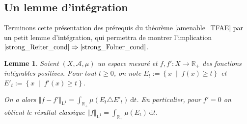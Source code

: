 \documentclass[a4paper,12pt]{article}
\newtheorem{lemma}[theorem]{Lemme}
\newcommand{\R}{\mathbb{R}}
\newcommand{\ev}{\mathrm{ev}}
\newcommand{\norm}[1]{\left\Vert #1\right\Vert}
\newcommand{\abs}[1]{\left\vert#1\right\vert}
\newcommand{\set}[1]{\left\{ #1 \right\}}
\newcommand{\integral}[4]{\int_{#1}^{#2} #3~\mathrm{d}#4}
\newcommand\fundef[3]{#1: \left\{\begin{array}{ccc}#2\\#3\end{array}\right.}
\newcommand{\tq}{\;\middle|\;}
\newcommand{\ssi}{si et seulement si }
\newcommand{\inv}{^{-1}}
\newcommand{\comp}{\circ}
\newcommand{\nhds}{\mathcal{N}}
\renewcommand{\implies}{\Rightarrow}
\renewcommand{\iff}{\Leftrightarrow}
\begin{document}

\subsection{Un lemme d'intégration}

Terminons cette présentation des prérequis du théorème \ref{amenable_TFAE} par un petit lemme d'intégration,
qui permettra de montrer l'implication $\eqref{strong_Reiter_cond}\implies\eqref{strong_Folner_cond}$. 

\begin{lemma}\label{folner_key}
    Soient $(X, \mathcal{A}, \mu)$ un espace mesuré et $f, f':X\to\R_+$ des fonctions intégrables positives.
    Pour tout $t\geq0$, on note $E_t := \set{x\tq f(x)\geq t}$ et $E'_t := \set{x\tq f'(x)\geq t}$.

    On a alors $\norm{f - f'}_{\mathrm{L}^1} = \integral{\R_+}{}{\mu(E_t\triangle E'_t)}{t}$. En particulier, pour $f' = 0$
    on obtient le résultat classique $\norm{f}_{\mathrm{L}^1} = \integral{\R_+}{}{\mu(E_t)}{t}$.
\end{lemma}
\end{document}
